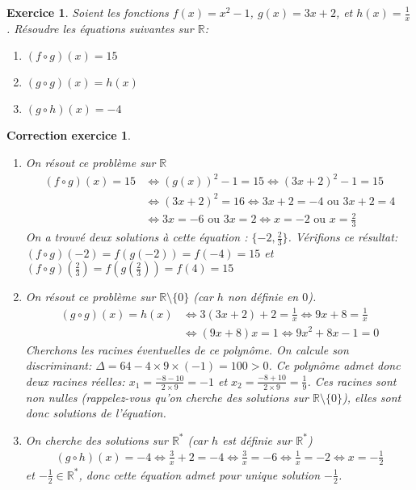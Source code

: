 \documentclass[12pt]{article}
\newtheorem{exercice}{\bf Exercice}
\newtheorem{correction}{\bf Correction exercice}
\newenvironment{exo}{
  \begin{exercice}\normalfont}{\end{exercice}
}
\newenvironment{cor}{
\begin{correction}\smallskip\normalfont}{\end{correction}
}
\newcommand*{\R}{\mathbb{R}}
\newif\ifcorrige\corrigetrue
\begin{document}


\begin{exo} Soient les fonctions $f(x) = x^2-1$, $g(x) = 3x+2$, et $h(x) = \frac1x$.
  R\'esoudre les \'equations suivantes sur $\R$:
\begin{multicols}{3}
\begin{enumerate}
\item $(f \circ g)(x) = 15$
\item $(g \circ g)(x) = h(x)$
\item $(g \circ h)(x) = -4$
\end{enumerate}
\end{multicols}
\end{exo}

\ifcorrige
\color{magenta}
\begin{cor}
  $\qquad$
\begin{enumerate}
\item On r\'esout ce probl\`eme sur $\R$
  \begin{align*}
    (f \circ g)(x) = 15
    &\iff
    (g(x))^2-1 = 15
    \iff
    (3x+2)^2-1 = 15
    \\
    &\iff
    (3x+2)^2 = 16
    \iff
    3x+2 = -4 \text{  ou  } 3x+2 = 4
    \\
    &\iff 3x = -6 \text{  ou  } 3x = 2
    \iff x = -2 \text{  ou  } x = \frac23
  \end{align*}
  On a trouv\'e deux solutions \`a cette \'equation : $\{-2,\frac23\}$.
  V\'erifions ce r\'esultat:
  $(f \circ g)(-2) = f(g(-2)) = f(-4) = 15$
  et $(f \circ g)(\frac23) = f(g(\frac23)) = f(4) = 15$
\item On r\'esout ce probl\`eme sur $\R \setminus \{ 0 \}$
  (car $h$ non d\'efinie en $0$).
  \begin{align*}
    (g \circ g)(x) = h(x)
    &\iff
    3(3x+2)+2 = \frac1x
    \iff
    9x+8 = \frac1x
    \\
    &\iff
    (9x+8)x = 1
    \iff
    9x^2+8x -1 = 0
  \end{align*}
  Cherchons les racines \'eventuelles de ce polyn\^ome.
  On calcule son discriminant:
  $\Delta = 64 - 4 \times 9 \times (-1) = 100 > 0$.
  Ce polyn\^ome admet donc deux racines r\'eelles:
  $x_1 = \frac{-8 -10}{2 \times 9} = -1$ et $x_2 = \frac{-8+10}{2 \times 9} = \frac19$.
  Ces racines sont non nulles (rappelez-vous qu'on cherche des solutions sur $\R \setminus \{ 0 \}$),
  elles sont donc solutions de l'\'equation.

\item On cherche des solutions sur $\R^*$ (car $h$ est d\'efinie sur $\R^*$)
  \begin{align*}
    (g \circ h)(x) = -4
    \iff
    \frac3x + 2 = -4
    \iff
    \frac3x = -6
    \iff
    \frac1x = -2
    \iff
    x = - \frac12
  \end{align*}
  et $- \frac12 \in \R^*$, donc cette \'equation admet pour unique solution $- \frac12$.
\end{enumerate}
\end{cor}
\color{black}
\fi
\end{document}
